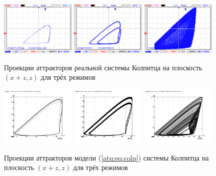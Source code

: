 \begin{figure}[htb!]
 \centerline{
   \includegraphics[width=0.32\textwidth]{p/cha/colp/colp_m1_vv.png}
   \includegraphics[width=0.32\textwidth]{p/cha/colp/colp_m2_vv.png}
   \includegraphics[width=0.32\textwidth]{p/cha/colp/colp_m3_vv_ac.png}
 }
  \caption{Проекции аттракторов реальной системы Колпитца на плоскость $(x+z,z)$
  для трёх режимов}
  \label{atu:f:colp_real_xzz}
\end{figure}

\begin{figure}[htb!]
 \centerline{
   \includegraphics[width=0.32\textwidth]{p/cha/colp/colp_0-p_z_xpz_b=1x70.png}
   \includegraphics[width=0.32\textwidth]{p/cha/colp/colp_0-p_z_xpz_b=1x37.png}
   \includegraphics[width=0.32\textwidth]{p/cha/colp/colp_0-p_z_xpz_b=0x99.png}
 }
  \caption{Проекции аттракторов модели (\ref{atu:eq:colp}) системы Колпитца на плоскость $(x+z,z)$
  для трёх режимов}
  \label{atu:f:colp_model_xzz}
\end{figure}


